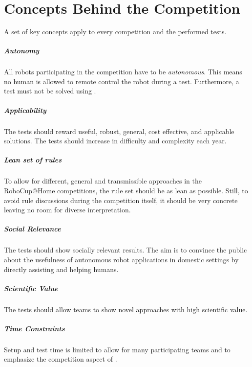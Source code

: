 \chapter{Concepts Behind the Competition}
\label{chap:concepts}
A set of key concepts apply to every \RoboCup\AtHome{} competition and the performed tests.

\paragraph{Autonomy}
\label{sec:concepts:autonomy}
All robots participating in the \RoboCup\AtHome{} competition have to be \emph{autonomous}. This means no human is allowed to remote control the robot during a test. Furthermore, a test must not be solved using \OLC{}.

\paragraph{Applicability}
\label{sec:concepts:applicability}
The tests should reward useful, robust, general, cost effective, and applicable solutions. The tests should increase in difficulty and complexity each year.

\paragraph{Lean set of rules}
\label{sec:concepts:leanrules}
To allow for different, general and transmissible approaches in the RoboCup@Home competitions, the rule set should be as lean as possible. Still, to avoid rule discussions during the competition itself, it should be very concrete leaving no room for diverse interpretation.

\paragraph{Social Relevance}
\label{sec:concepts:socialrelevance}
The tests should show socially relevant results. The aim is to convince the public about the usefulness of autonomous robot applications in domestic settings by directly assisting and helping humans.

\paragraph{Scientific Value}
\label{sec:concepts:scientificvalue}
The tests should allow teams to show novel approaches with high scientific value.

\paragraph{Time Constraints}
\label{sec:concepts:timeconstraints}
Setup and test time is limited to allow for many participating teams and to emphasize the competition aspect of \AtHome{}.

